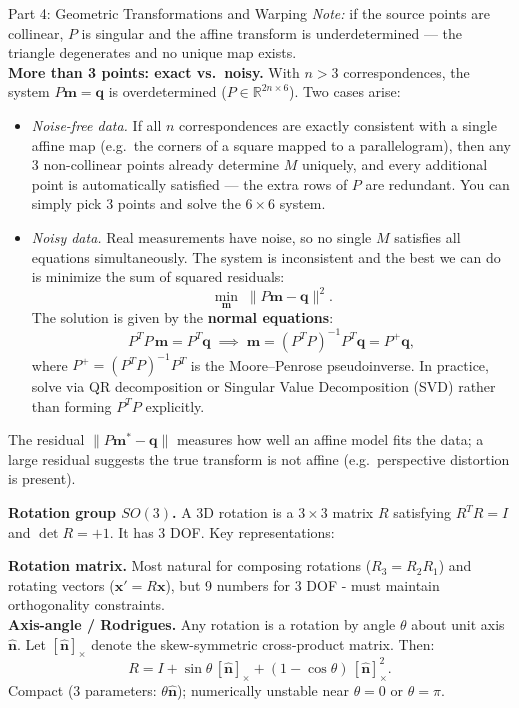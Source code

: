 \documentclass[letterpaper]{article}
\begin{document}
\begin{notes}{Part 4: Geometric Transformations and Warping}
\emph{Note:} if the source points are collinear, $P$ is singular and the affine transform is underdetermined --- the triangle degenerates and no unique map exists.\\

\textbf{More than 3 points: exact vs.\ noisy.} With $n > 3$ correspondences, the system $P\mathbf{m} = \mathbf{q}$ is overdetermined ($P \in \mathbb{R}^{2n\times6}$). Two cases arise:

\begin{itemize}
  \item \emph{Noise-free data.} If all $n$ correspondences are exactly consistent with a single affine map (e.g.\ the corners of a square mapped to a parallelogram), then any 3 non-collinear points already determine $M$ uniquely, and every additional point is automatically satisfied --- the extra rows of $P$ are redundant. You can simply pick 3 points and solve the $6\times6$ system.
  \item \emph{Noisy data.} Real measurements have noise, so no single $M$ satisfies all equations simultaneously. The system is inconsistent and the best we can do is minimize the sum of squared residuals:
  $$\min_{\mathbf{m}}\;\|P\mathbf{m} - \mathbf{q}\|^2.$$
  The solution is given by the \textbf{normal equations}:
  $$P^T P\,\mathbf{m} = P^T\mathbf{q} \;\implies\; \mathbf{m} = (P^TP)^{-1}P^T\mathbf{q} = P^+\mathbf{q},$$
  where $P^+ = (P^TP)^{-1}P^T$ is the Moore--Penrose pseudoinverse. In practice, solve via QR decomposition or Singular Value Decomposition (SVD) rather than forming $P^TP$ explicitly.
\end{itemize}

The residual $\|P\mathbf{m}^* - \mathbf{q}\|$ measures how well an affine model fits the data; a large residual suggests the true transform is not affine (e.g.\ perspective distortion is present).




\textbf{Rotation group $SO(3)$.} A 3D rotation is a $3\times3$ matrix $R$ satisfying $R^TR=I$ and $\det R=+1$. It has 3 DOF. Key representations:

\textbf{Rotation matrix.} Most natural for composing rotations ($R_3 = R_2 R_1$) and rotating vectors ($\mathbf{x}' = R\mathbf{x}$), but 9 numbers for 3 DOF - must maintain orthogonality constraints.\\

\textbf{Axis-angle / Rodrigues.} Any rotation is a rotation by angle $\theta$ about unit axis $\hat{\mathbf{n}}$. Let $[\hat{\mathbf{n}}]_\times$ denote the skew-symmetric cross-product matrix. Then:
$$R = I + \sin\theta\,[\hat{\mathbf{n}}]_\times + (1-\cos\theta)\,[\hat{\mathbf{n}}]_\times^2.$$
Compact (3 parameters: $\theta\hat{\mathbf{n}}$); numerically unstable near $\theta=0$ or $\theta=\pi$.\\


\end{notes}
\end{document}
